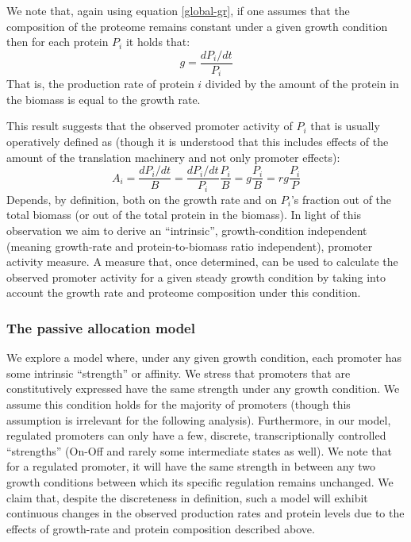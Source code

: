 \documentclass[a4page,notitlepage]{article}
\begin{document}
We note that, again using equation \ref{global-gr}, if one assumes that the composition of the proteome remains constant under a given growth condition then for each protein $P_i$ it holds that:
\[g=\frac{dP_i/dt}{P_i}\]
That is, the production rate of protein $i$ divided by the amount of the protein in the biomass is equal to the growth rate.

This result suggests that the observed promoter activity of $P_i$ that is usually operatively defined as (though it is understood that this includes effects of the amount of the translation machinery and not only promoter effects):
\begin{equation}
\label{pa-gr-relation}
A_i=\frac{dP_i/dt}{B}=\frac{dP_i/dt}{P_i}\frac{P_i}{B}=g\frac{P_i}{B}=rg\frac{P_i}{P}
\end{equation}
Depends, by definition, both on the growth rate and on $P_i$’s fraction out of the total biomass (or out of the total protein in the biomass).
In light of this observation we aim to derive an “intrinsic”, growth-condition independent (meaning growth-rate and protein-to-biomass ratio independent), promoter activity measure.
A measure that, once determined, can be used to calculate the observed promoter activity for a given steady growth condition by taking into account the growth rate and proteome composition under this condition.
\subsubsection{The passive allocation model}
We explore a model where, under any given growth condition, each promoter has some intrinsic ``strength'' or affinity.
We stress that promoters that are constitutively expressed have the same strength under any growth condition.
We assume this condition holds for the majority of promoters (though this assumption is irrelevant for the following analysis).
Furthermore, in our model, regulated promoters can only have a few, discrete, transcriptionally controlled ``strengths'' (On-Off and rarely some intermediate states as well).
We note that for a regulated promoter, it will have the same strength in between any two growth conditions between which its specific regulation remains unchanged.
We claim that, despite the discreteness in definition, such a model will exhibit continuous changes in the observed production rates and protein levels due to the effects of growth-rate and protein composition described above.
\end{document}
